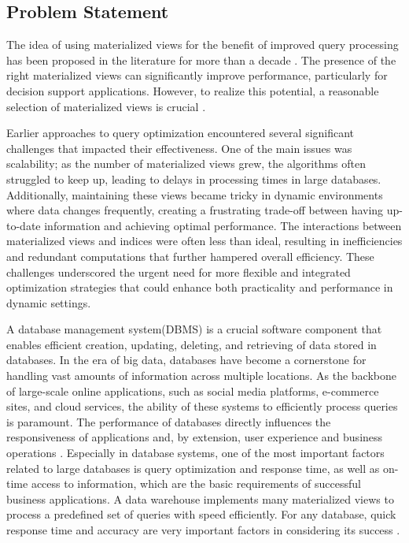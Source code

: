 \subsection{Problem Statement}
The idea of using materialized views for the benefit of improved query processing has been proposed in the literature for more than a decade \cite{Blakeley1986EfficientlyUM}. The presence of the right materialized views can significantly improve performance, particularly for decision support applications. However, to realize this potential, a reasonable selection of materialized views is crucial \cite{agrawal2000automated}.\vspace{.4cm}

Earlier approaches to query optimization encountered several significant challenges that impacted their effectiveness. One of the main issues was scalability; as the number of materialized views grew, the algorithms often struggled to keep up, leading to delays in processing times in large databases. Additionally, maintaining these views became tricky in dynamic environments where data changes frequently, creating a frustrating trade-off between having up-to-date information and achieving optimal performance. The interactions between materialized views and indices were often less than ideal, resulting in inefficiencies and redundant computations that further hampered overall efficiency. These challenges underscored the urgent need for more flexible and integrated optimization strategies that could enhance both practicality and performance in dynamic settings.\vspace{.4cm}

A database management system(DBMS) is a crucial software component that enables efficient creation, updating, deleting, and retrieving of data stored in databases. In the era of big data, databases have become a cornerstone for handling vast amounts of information across multiple locations. As the backbone of large-scale online applications, such as social media platforms, e-commerce sites, and cloud services, the ability of these systems to efficiently process queries is paramount. The performance of databases directly influences the responsiveness of applications and, by extension, user experience and business operations \cite{4}. Especially in database systems, one of the most important factors related to large databases is query optimization and response time, as well as on-time access to information, which are the basic requirements of successful business applications. A data warehouse implements many materialized views to process a predefined set of queries with speed efficiently. For any database, quick response time and accuracy are very important factors in considering its success \cite{karde2010selection}.\vspace{.4cm}

